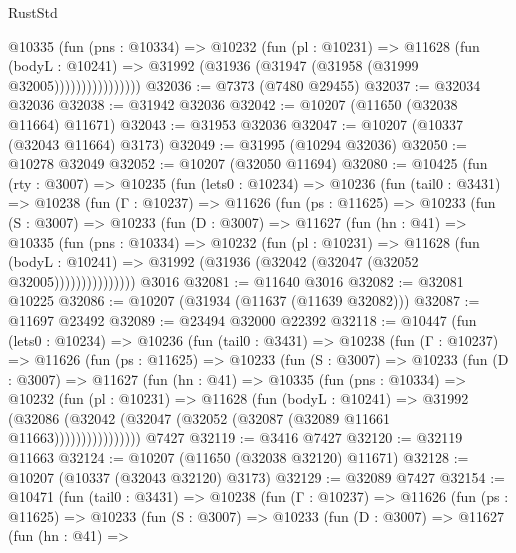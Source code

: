 \begin{lexlean}{RustStd}
\begin{coremodule}
                    @10335
                      (fun (pns : @10334) =>
                      @10232
                        (fun (pl : @10231) =>
                        @11628
                          (fun (bodyL : @10241) =>
                          @31992 (@31936 (@31947 (@31958 (@31999 @32005))))))))))))))))
@32036 := @7373 (@7480 @29455)
@32037 := @32034 @32036
@32038 := @31942 @32036
@32042 := @10207 (@11650 (@32038 @11664) @11671)
@32043 := @31953 @32036
@32047 := @10207 (@10337 (@32043 @11664) @3173)
@32049 := @31995 (@10294 @32036)
@32050 := @10278 @32049
@32052 := @10207 (@32050 @11694)
@32080 := @10425
    (fun (rty : @3007) =>
    @10235
      (fun (lets0 : @10234) =>
      @10236
        (fun (tail0 : @3431) =>
        @10238
          (fun (Γ : @10237) =>
          @11626
            (fun (ps : @11625) =>
            @10233
              (fun (S : @3007) =>
              @10233
                (fun (D : @3007) =>
                @11627
                  (fun (hn : @41) =>
                  @10335
                    (fun (pns : @10334) =>
                    @10232
                      (fun (pl : @10231) =>
                      @11628
                        (fun (bodyL : @10241) =>
                        @31992 (@31936 (@32042 (@32047 (@32052 @32005)))))))))))))))
    @3016
@32081 := @11640 @3016
@32082 := @32081 @10225
@32086 := @10207 (@31934 (@11637 (@11639 @32082)))
@32087 := @11697 @23492
@32089 := @23494 @32000 @22392
@32118 := @10447
    (fun (lets0 : @10234) =>
    @10236
      (fun (tail0 : @3431) =>
      @10238
        (fun (Γ : @10237) =>
        @11626
          (fun (ps : @11625) =>
          @10233
            (fun (S : @3007) =>
            @10233
              (fun (D : @3007) =>
              @11627
                (fun (hn : @41) =>
                @10335
                  (fun (pns : @10334) =>
                  @10232
                    (fun (pl : @10231) =>
                    @11628
                      (fun (bodyL : @10241) =>
                      @31992
                        (@32086
                          (@32042 (@32047 (@32052 (@32087 (@32089 @11661 @11663))))))))))))))))
    @7427
@32119 := @3416 @7427
@32120 := @32119 @11663
@32124 := @10207 (@11650 (@32038 @32120) @11671)
@32128 := @10207 (@10337 (@32043 @32120) @3173)
@32129 := @32089 @7427
@32154 := @10471
    (fun (tail0 : @3431) =>
    @10238
      (fun (Γ : @10237) =>
      @11626
        (fun (ps : @11625) =>
        @10233
          (fun (S : @3007) =>
          @10233
            (fun (D : @3007) =>
            @11627
              (fun (hn : @41) =>

\end{coremodule}
\end{lexlean}
